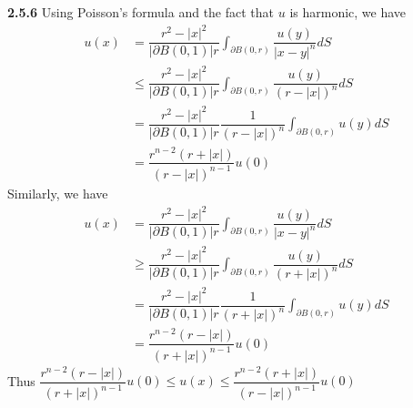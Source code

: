 \documentclass[../main.tex]{subfiles}
\begin{document}
\begin{customproblem}\textbf{2.5.6}
Using Poisson's formula and the fact that $u$ is harmonic, we have \[
\begin{aligned}
u(x)
&=\dfrac{r^{2}-|x|^{2}}{|\partial B(0,1)| r}\int_{\partial B(0,r)}\dfrac{u(y)}{|x-y|^{n}}dS \\
&\leq \dfrac{r^{2}-|x|^{2}}{|\partial B(0,1)| r}\int_{\partial B(0,r)}\dfrac{u(y)}{(r-|x|)^{n}}dS \\
&= \dfrac{r^{2}-|x|^{2}}{|\partial B(0,1)| r}\dfrac{1}{(r-|x|)^{n}}\int_{\partial B(0,r)}u(y)dS \\
&= \dfrac{r^{n-2}(r+|x|)}{(r-|x|)^{n-1}}u(0)
\end{aligned}
\]Similarly, we have\[
\begin{aligned}
u(x)
&=\dfrac{r^{2}-|x|^{2}}{|\partial B(0,1)| r}\int_{\partial B(0,r)}\dfrac{u(y)}{|x-y|^{n}}dS \\
&\geq \dfrac{r^{2}-|x|^{2}}{|\partial B(0,1)| r}\int_{\partial B(0,r)}\dfrac{u(y)}{(r+|x|)^{n}}dS \\
&= \dfrac{r^{2}-|x|^{2}}{|\partial B(0,1)| r}\dfrac{1}{(r+|x|)^{n}}\int_{\partial B(0,r)}u(y)dS \\
&= \dfrac{r^{n-2}(r-|x|)}{(r+|x|)^{n-1}}u(0)
\end{aligned}
\]Thus $\dfrac{r^{n-2}(r-|x|)}{(r+|x|)^{n-1}}u(0) \leq u(x) \leq \dfrac{r^{n-2}(r+|x|)}{(r-|x|)^{n-1}}u(0)$
\end{customproblem}
\end{document}
